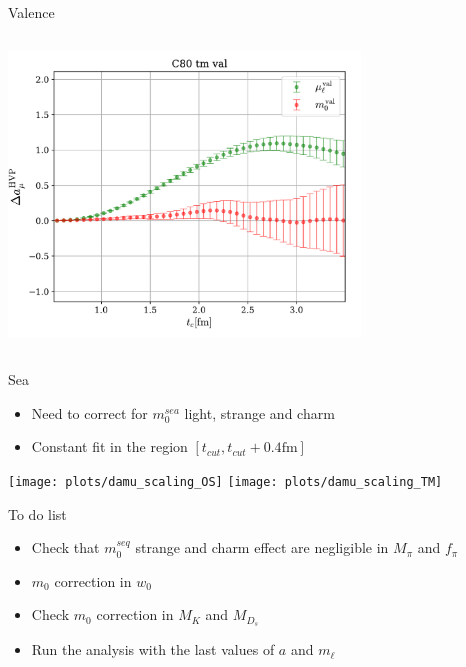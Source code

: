\documentclass[xcolor={dvipsnames,table}]{beamer}
\begin{document}
\begin{frame}{Valence}
\begin{columns}
\begin{column}{0.5\textwidth}
      \includegraphics[trim=0cm 0.0cm 0cm 0cm, clip,width=0.7\textwidth]{plots-francesca/C80_TM_val.pdf}
    \end{column}
  \end{columns}
\end{frame}

\begin{frame}{Sea}
  \begin{itemize}
    \item Need to correct for $m_0^{sea}$ light, strange and charm
    \item Constant fit in the region $[t_{cut}, t_{cut}+0.4\text{fm}]$
  \end{itemize}
  \texttt{[image: plots/damu\_scaling\_OS]}
  \texttt{[image: plots/damu\_scaling\_TM]}
\end{frame}

\begin{frame}{To do list}
  \begin{itemize}
    \item Check that $m_0^{seq}$ strange and charm effect are negligible in $M_\pi$ and $f_\pi$
    \item $m_0$ correction in $w_0$
    \item Check $m_0$ correction in $M_K$ and $M_{D_s}$
    \item Run the analysis with the last values of $a$ and $m_{\ell}$
  \end{itemize}
\end{frame}
\end{document}
